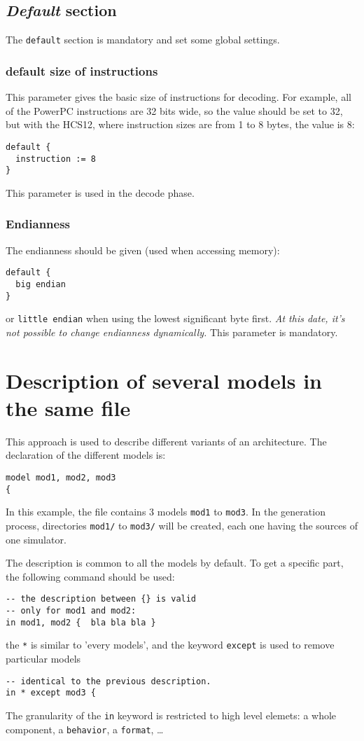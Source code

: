 \subsection{\emph{Default} section}
\label{sec:default}
The \texttt{default} section is mandatory and set some global settings.
\subsubsection{default size of instructions}
This parameter gives the basic size of instructions for decoding. For example, all of the PowerPC instructions are 32 bits wide, so the value should be set to 32, but with the HCS12, where instruction sizes are from 1 to 8 bytes, the value is 8:
\begin{lstlisting}
default {
  instruction := 8
}
\end{lstlisting}
This parameter is used in the decode phase.

\subsubsection{Endianness}
The endianness should be given (used when accessing memory):
\begin{lstlisting}
default {
  big endian
}
\end{lstlisting}
or \texttt{little endian} when using the lowest significant byte first.
\emph{At this date, it's not possible to change endianness dynamically.}
This parameter is mandatory.

\section{Description of several models in the same file}
\label{sec:plusieursModeles}
This approach is used to describe different variants of an architecture.
The declaration of the different models is:
\begin{lstlisting}
model mod1, mod2, mod3 
{
\end{lstlisting}
In this example, the file contains 3 models \texttt{mod1} to \texttt{mod3}. In the generation process, directories \texttt{mod1/} to \texttt{mod3/} will be created, each one having the sources of one simulator.

The description is common to all the models by default. To get a specific part, the following command should be used:
\begin{lstlisting}
-- the description between {} is valid
-- only for mod1 and mod2:
in mod1, mod2 {  bla bla bla }
\end{lstlisting}
the \texttt{*} is similar to 'every models', and the keyword \texttt{except} is used to remove particular models
\begin{lstlisting}
-- identical to the previous description.
in * except mod3 { 
\end{lstlisting}

The granularity of the \texttt{in} keyword is restricted to high level elemets: a whole component, a \texttt{behavior}, a \texttt{format}, \ldots
